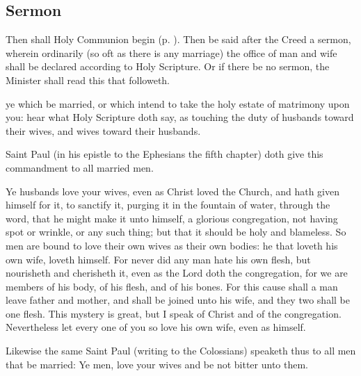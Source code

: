 

\subsection{Sermon}
\begin{rubric}
	Then shall Holy Communion begin (p. \pageref{MatrimonyMass}). Then be said after the Creed a sermon, wherein ordinarily (so oft as there is any marriage) the office of man and wife shall be declared according to Holy Scripture. Or if there be no sermon, the Minister shall read this that followeth.
\end{rubric}
 ye which be married, or which intend to take the holy estate of matrimony upon you: hear what Holy Scripture doth say, as touching the duty of husbands toward their wives, and wives toward their husbands.\par
    Saint Paul (in his epistle to the Ephesians the fifth chapter) doth give this commandment to all married men.\par
    Ye husbands love your wives, even as Christ loved the Church, and hath given himself for it, to sanctify it, purging it in the fountain of water, through the word, that he might make it unto himself, a glorious congregation, not having spot or wrinkle, or any such thing; but that it should be holy and blameless. So men are bound to love their own wives as their own bodies: he that loveth his own wife, loveth himself. For never did any man hate his own flesh, but nourisheth and cherisheth it, even as the Lord doth the congregation, for we are members of his body, of his flesh, and of his bones. For this cause shall a man leave father and mother, and shall be joined unto his wife, and they two shall be one flesh. This mystery is great, but I speak of Christ and of the congregation. Nevertheless let every one of you so love his own wife, even as himself.\par
    Likewise the same Saint Paul (writing to the Colossians) speaketh thus to all men that be married: Ye men, love your wives and be not bitter unto them.\par
